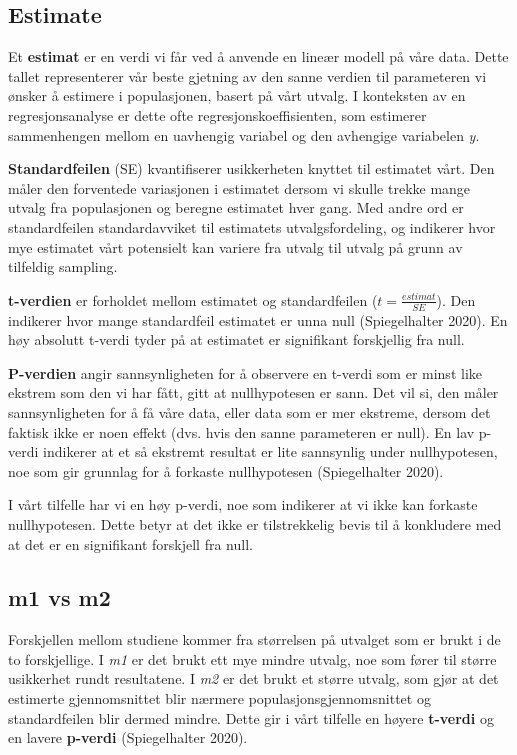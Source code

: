 \documentclass[
  letterpaper,
  DIV=11,
  numbers=noendperiod]{scrreprt}
\begin{document}
\subsection{Estimate}\label{estimate}

Et \textbf{estimat} er en verdi vi får ved å anvende en lineær modell på
våre data. Dette tallet representerer vår beste gjetning av den sanne
verdien til parameteren vi ønsker å estimere i populasjonen, basert på
vårt utvalg. I konteksten av en regresjonsanalyse er dette ofte
regresjonskoeffisienten, som estimerer sammenhengen mellom en uavhengig
variabel og den avhengige variabelen \emph{y}.

\textbf{Standardfeilen} (SE) kvantifiserer usikkerheten knyttet til
estimatet vårt. Den måler den forventede variasjonen i estimatet dersom
vi skulle trekke mange utvalg fra populasjonen og beregne estimatet hver
gang. Med andre ord er standardfeilen standardavviket til estimatets
utvalgsfordeling, og indikerer hvor mye estimatet vårt potensielt kan
variere fra utvalg til utvalg på grunn av tilfeldig sampling.

\textbf{t-verdien} er forholdet mellom estimatet og standardfeilen
(\(t = \frac{{estimat}}{{SE}}\)). Den indikerer hvor mange standardfeil
estimatet er unna null (Spiegelhalter 2020). En høy absolutt t-verdi
tyder på at estimatet er signifikant forskjellig fra null.

\textbf{P-verdien} angir sannsynligheten for å observere en t-verdi som
er minst like ekstrem som den vi har fått, gitt at nullhypotesen er
sann. Det vil si, den måler sannsynligheten for å få våre data, eller
data som er mer ekstreme, dersom det faktisk ikke er noen effekt (dvs.
hvis den sanne parameteren er null). En lav p-verdi indikerer at et så
ekstremt resultat er lite sannsynlig under nullhypotesen, noe som gir
grunnlag for å forkaste nullhypotesen (Spiegelhalter 2020).

I vårt tilfelle har vi en høy p-verdi, noe som indikerer at vi ikke kan
forkaste nullhypotesen. Dette betyr at det ikke er tilstrekkelig bevis
til å konkludere med at det er en signifikant forskjell fra null.

\subsection{m1 vs m2}\label{m1-vs-m2}

Forskjellen mellom studiene kommer fra størrelsen på utvalget som er
brukt i de to forskjellige. I \emph{m1} er det brukt ett mye mindre
utvalg, noe som fører til større usikkerhet rundt resultatene. I
\emph{m2} er det brukt et større utvalg, som gjør at det estimerte
gjennomsnittet blir nærmere populasjonsgjennomsnittet og standardfeilen
blir dermed mindre. Dette gir i vårt tilfelle en høyere \textbf{t-verdi}
og en lavere \textbf{p-verdi} (Spiegelhalter 2020).
\end{document}
